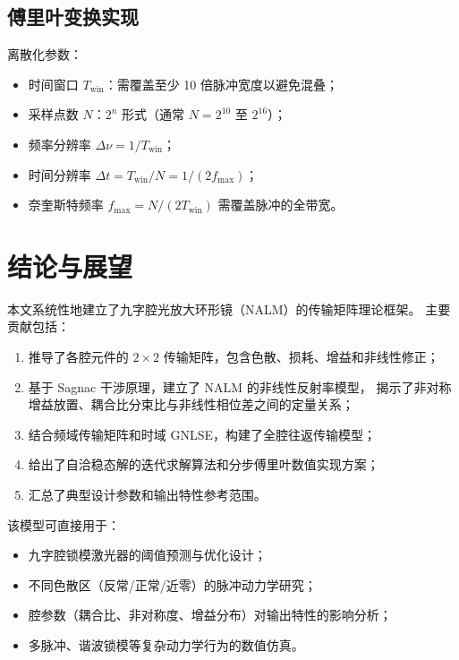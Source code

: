 \documentclass[11pt,a4paper]{ctexart}
\begin{document}
\subsection{傅里叶变换实现}

离散化参数：
\begin{itemize}
  \item 时间窗口 $T_{\text{win}}$：需覆盖至少 10 倍脉冲宽度以避免混叠；
  \item 采样点数 $N$：$2^n$ 形式（通常 $N = 2^{10}$ 至 $2^{16}$）；
  \item 频率分辨率 $\Delta\nu = 1/T_{\text{win}}$；
  \item 时间分辨率 $\Delta t = T_{\text{win}}/N = 1/(2 f_{\text{max}})$；
  \item 奈奎斯特频率 $f_{\text{max}} = N/(2T_{\text{win}})$ 需覆盖脉冲的全带宽。
\end{itemize}

\section{结论与展望}
\label{sec:conclusion}

本文系统性地建立了九字腔光放大环形镜（NALM）的传输矩阵理论框架。
主要贡献包括：

\begin{enumerate}
  \item 推导了各腔元件的 $2\times2$ 传输矩阵，包含色散、损耗、增益和非线性修正；
  \item 基于 Sagnac 干涉原理，建立了 NALM 的非线性反射率模型，
        揭示了非对称增益放置、耦合比分束比与非线性相位差之间的定量关系；
  \item 结合频域传输矩阵和时域 GNLSE，构建了全腔往返传输模型；
  \item 给出了自洽稳态解的迭代求解算法和分步傅里叶数值实现方案；
  \item 汇总了典型设计参数和输出特性参考范围。
\end{enumerate}

该模型可直接用于：
\begin{itemize}
  \item 九字腔锁模激光器的阈值预测与优化设计；
  \item 不同色散区（反常/正常/近零）的脉冲动力学研究；
  \item 腔参数（耦合比、非对称度、增益分布）对输出特性的影响分析；
  \item 多脉冲、谐波锁模等复杂动力学行为的数值仿真。
\end{itemize}
\end{document}
